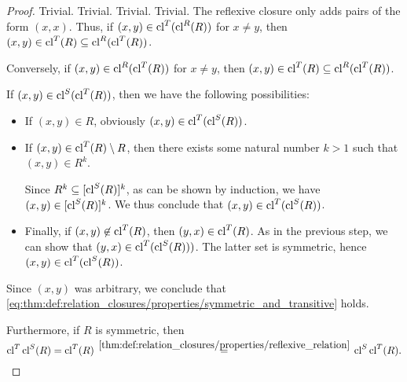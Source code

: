 \begin{proof}
   Trivial.
   Trivial.
   Trivial.
   Trivial.
   The reflexive closure only adds pairs of the form \( (x, x) \). Thus, if \( (x, y) \in \operatorname{cl}^T(\operatorname{cl}^R(R)) \) for \( x \neq y \), then \( (x, y) \in \operatorname{cl}^T(R) \subseteq \operatorname{cl}^R(\operatorname{cl}^T(R)) \).

  Conversely, if \( (x, y) \in \operatorname{cl}^R(\operatorname{cl}^T(R)) \) for \( x \neq y \), then \( (x, y) \in \operatorname{cl}^T(R) \subseteq \operatorname{cl}^R(\operatorname{cl}^T(R)) \).

   If \( (x, y) \in \operatorname{cl}^S(\operatorname{cl}^T(R)) \), then we have the following possibilities:
  \begin{itemize}
    \item If \( (x, y) \in R \), obviously \( (x, y) \in \operatorname{cl}^T(\operatorname{cl}^S(R)) \).
    \item If \( (x, y) \in \operatorname{cl}^T(R) \setminus R \), then there exists some natural number \( k > 1 \) such that \( (x, y) \in R^k \).

    Since \( R^k \subseteq [\operatorname{cl}^S(R)]^k \), as can be shown by induction, we have \( (x, y) \in [\operatorname{cl}^S(R)]^k \). We thus conclude that \( (x, y) \in \operatorname{cl}^T(\operatorname{cl}^S(R)) \).

    \item Finally, if \( (x, y) \not\in \operatorname{cl}^T(R) \), then \( (y, x) \in \operatorname{cl}^T(R) \). As in the previous step, we can show that \( (y, x) \in \operatorname{cl}^T(\operatorname{cl}^S(R))) \). The latter set is symmetric, hence \( (x, y) \in \operatorname{cl}^T(\operatorname{cl}^S(R)) \).
  \end{itemize}

  Since \( (x, y) \) was arbitrary, we conclude that \eqref{eq:thm:def:relation_closures/properties/symmetric_and_transitive} holds.

  Furthermore, if \( R \) is symmetric, then
  \begin{equation*}
    \cl^T \cl^S(R)
    =
    \cl^T(R)
    \reloset {\ref{thm:def:relation_closures/properties/reflexive_relation}} =
    \cl^S \cl^T(R).
  \end{equation*}
\end{proof}

